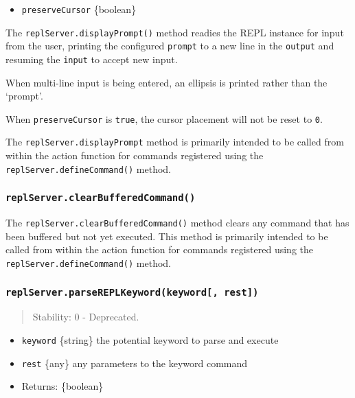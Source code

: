 \begin{itemize}
\tightlist
\item
  \texttt{preserveCursor} \{boolean\}
\end{itemize}

The \texttt{replServer.displayPrompt()} method readies the REPL instance
for input from the user, printing the configured \texttt{prompt} to a
new line in the \texttt{output} and resuming the \texttt{input} to
accept new input.

When multi-line input is being entered, an ellipsis is printed rather
than the `prompt'.

When \texttt{preserveCursor} is \texttt{true}, the cursor placement will
not be reset to \texttt{0}.

The \texttt{replServer.displayPrompt} method is primarily intended to be
called from within the action function for commands registered using the
\texttt{replServer.defineCommand()} method.

\subsubsection{\texorpdfstring{\texttt{replServer.clearBufferedCommand()}}{replServer.clearBufferedCommand()}}\label{replserver.clearbufferedcommand}

The \texttt{replServer.clearBufferedCommand()} method clears any command
that has been buffered but not yet executed. This method is primarily
intended to be called from within the action function for commands
registered using the \texttt{replServer.defineCommand()} method.

\subsubsection{\texorpdfstring{\texttt{replServer.parseREPLKeyword(keyword{[},\ rest{]})}}{replServer.parseREPLKeyword(keyword{[}, rest{]})}}\label{replserver.parsereplkeywordkeyword-rest}

\begin{quote}
Stability: 0 - Deprecated.
\end{quote}

\begin{itemize}
\tightlist
\item
  \texttt{keyword} \{string\} the potential keyword to parse and execute
\item
  \texttt{rest} \{any\} any parameters to the keyword command
\item
  Returns: \{boolean\}
\end{itemize}

